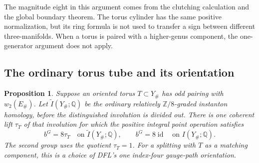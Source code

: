 \documentclass[11pt]{amsart}
\newtheorem{proposition}[theorem]{Proposition}
\theoremstyle{definition}
\theoremstyle{remark}
\theoremstyle{plain}
\newcommand{\id}{\operatorname{id}}
\begin{document}
The magnitude eight in this argument comes from
the clutching calculation and the global boundary
theorem. The torus cylinder has the same positive
normalization, but its ring formula is not used
to transfer a sign between different three-manifolds.
When a torus is paired with a higher-genus component,
the one-generator argument does not apply.


\subsection{The ordinary torus tube and its orientation}
\label{sec:ordinary-torus-tube}

\begin{proposition}\label{prop:torus-tube-point-operation}
Suppose an oriented torus $T\subset Y_\#$ has odd pairing
with $w_2(E_\#)$. Let $\widetilde I(Y_\#;\mathbb Q)$ be
the ordinary relatively $\mathbb Z/8$-graded instanton
homology, before the distinguished involution is divided
out. There is one coherent lift $\tau_T$ of that
involution for which the positive integral point
operation satisfies
\[
 b^G=8\tau_T\quad\text{on }\widetilde I(Y_\#;\mathbb Q),
 \qquad b^G=8\id\quad\text{on }I(Y_\#;\mathbb Q).
\]
The second group uses the quotient $\tau_T=1$.
For a splitting with $T$ as a matching component,
this is a choice of DFL's one index-four gauge-path
orientation.
\end{proposition}
\end{document}
